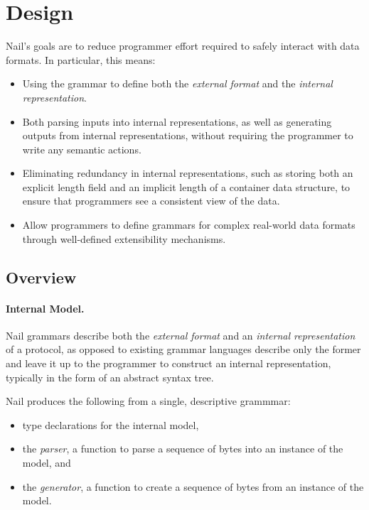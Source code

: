 \section{Design}
\label{s:design}

Nail's goals are to reduce programmer effort required to safely interact
with data formats.  In particular, this means:

\begin{itemize}

\item Using the grammar to define both the \emph{external format}
      and the \emph{internal representation}.

\item Both parsing inputs into internal representations, as well as
      generating outputs from internal representations, without
      requiring the programmer to write any semantic actions.

\item Eliminating redundancy in internal representations, such as
      storing both an explicit length field and an implicit length
      of a container data structure, to ensure that programmers
      see a consistent view of the data.

\item Allow programmers to define grammars for complex real-world
      data formats through well-defined extensibility mechanisms.

\end{itemize}

\subsection{Overview}

\paragraph{Internal Model.}
Nail grammars describe both the \emph{external format} and an \emph{internal representation} of a
protocol, as opposed to existing grammar languages describe only the former and leave it up to the programmer to
construct an internal representation, typically in the form of an abstract syntax tree. 

Nail produces the following from a single, descriptive grammmar: 
\begin{itemize}
\item type declarations for the internal model,
\item the \textit{parser}, a function to parse a sequence of bytes into an
instance of the model, and
\item the \textit{generator}, a function to create a
sequence of bytes from an instance of the model.
\end{itemize}

